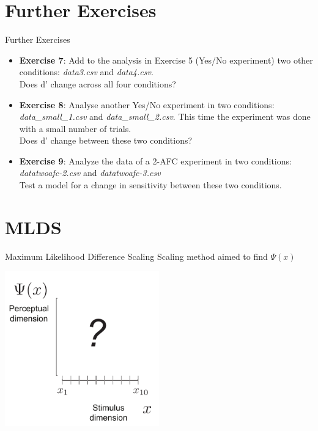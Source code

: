 \documentclass[10pt]{beamer}
\begin{document}
\section{Further Exercises}
\begin{frame}{Further Exercises}

\begin{itemize}

\item \textbf{Exercise 7}: Add to the analysis in Exercise 5 (Yes/No experiment) two other conditions: \textit{data3.csv} and \textit{data4.csv}. \\
Does d' change across all four conditions?

\vspace{20pt}
\item \textbf{Exercise 8}: Analyse another Yes/No experiment in two conditions: \textit{data\_small\_1.csv} and \textit{data\_small\_2.csv}. This time the experiment was done with a small number of trials.\\
Does d' change between these two conditions?


\vspace{20pt}
\item \textbf{Exercise 9}: Analyze the data of a 2-AFC experiment in two conditions: \textit{datatwoafc-2.csv} and \textit{datatwoafc-3.csv}\\
Test a model for a change in sensitivity between these two conditions.


\end{itemize}

\end{frame}



\section{MLDS}
\begin{frame}{Maximum Likelihood Difference Scaling}
Scaling method aimed to find $\Psi(x)$
\begin{center}
\includegraphics[width=0.5\textwidth]{figs/scaling_stimspacing.pdf}
\end{center}
\end{frame}
\end{document}
